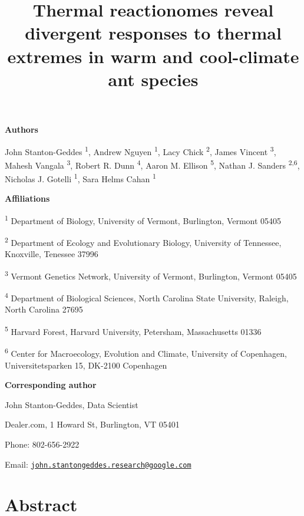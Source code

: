 \documentclass[]{article}
\title{Thermal reactionomes reveal divergent responses to thermal extremes in
warm and cool-climate ant species}
\author{}
\date{}
\begin{document}
\maketitle


\linenumbers

\newpage

\textbf{Authors}

John Stanton-Geddes \textsuperscript{1}, Andrew Nguyen
\textsuperscript{1}, Lacy Chick \textsuperscript{2}, James Vincent
\textsuperscript{3}, Mahesh Vangala \textsuperscript{3}, Robert R. Dunn
\textsuperscript{4}, Aaron M. Ellison \textsuperscript{5}, Nathan J.
Sanders \textsuperscript{2,6}, Nicholas J. Gotelli \textsuperscript{1},
Sara Helms Cahan \textsuperscript{1}

\vspace{10 mm}

\textbf{Affiliations}

\textsuperscript{1} Department of Biology, University of Vermont,
Burlington, Vermont 05405 \newline

\textsuperscript{2} Department of Ecology and Evolutionary Biology,
University of Tennessee, Knoxville, Tenessee 37996 \newline

\textsuperscript{3} Vermont Genetics Network, University of Vermont,
Burlington, Vermont 05405 \newline

\textsuperscript{4} Department of Biological Sciences, North Carolina
State University, Raleigh, North Carolina 27695 \newline

\textsuperscript{5} Harvard Forest, Harvard University, Petersham,
Massachusetts 01336 \newline

\textsuperscript{6} Center for Macroecology, Evolution and Climate,
University of Copenhagen, Universitetsparken 15, DK-2100 Copenhagen

\textbf{Corresponding author}

John Stanton-Geddes, Data Scientist

Dealer.com, 1 Howard St, Burlington, VT 05401

Phone: 802-656-2922

Email:
\href{mailto:john.stantongeddes.research@google.com}{\nolinkurl{john.stantongeddes.research@google.com}}

\newpage

\section{Abstract}\label{abstract}
\end{document}

